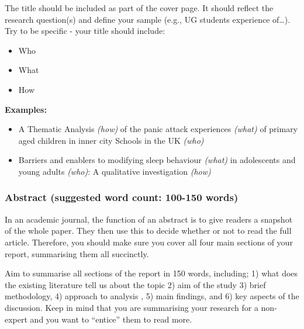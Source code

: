 \documentclass[
  english,
  letterpaper,
  DIV=11,
  numbers=noendperiod]{scrreprt}
\providecommand{\tightlist}{%
  \setlength{\itemsep}{0pt}\setlength{\parskip}{0pt}}
\begin{document}
The title should be included as part of the cover page. It should
reflect the research question(s) and define your sample (e.g., UG
students experience of\ldots). Try to be specific - your title should
include:

\begin{itemize}
\tightlist
\item
  Who
\item
  What
\item
  How
\end{itemize}

\textbf{Examples:}

\begin{itemize}
\tightlist
\item
  A Thematic Analysis \emph{(how)} of the panic attack experiences
  \emph{(what)} of primary aged children in inner city Schools in the UK
  \emph{(who)}
\item
  Barriers and enablers to modifying sleep behaviour \emph{(what)} in
  adolescents and young adults \emph{(who)}: A qualitative investigation
  \emph{(how)}
\end{itemize}

\subsubsection{Abstract (suggested word count: 100-150
words)}\label{abstract-suggested-word-count-100-150-words}

In an academic journal, the function of an abstract is to give readers a
snapshot of the whole paper. They then use this to decide whether or not
to read the full article. Therefore, you should make sure you cover all
four main sections of your report, summarising them all succinctly.

Aim to summarise all sections of the report in 150 words, including; 1)
what does the existing literature tell us about the topic 2) aim of the
study 3) brief methodology, 4) approach to analysis , 5) main findings,
and 6) key aspects of the discussion. Keep in mind that you are
summarising your research for a non-expert and you want to ``entice''
them to read more.
\end{document}
